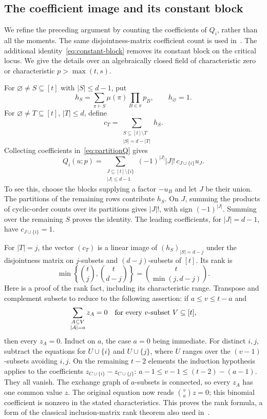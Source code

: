 \subsection{The coefficient image and its constant block}\label{app:compression}

We refine the preceding argument by counting the coefficients of
$Q_i$, rather than all the moments. The same disjointness-matrix
coefficient count is used in~\cite[Section 3]{Guo}. The additional
identity~\eqref{eq:constant-block} removes its constant block on
the critical locus. We give the details over an algebraically closed
field of characteristic zero or characteristic $p>\max(t,s)$.

For $\varnothing\ne S\subseteq[t]$ with $|S|\le d-1$, put
\[
 h_S=\sum_{\pi\vdash S}\mu(\pi)\prod_{B\in\pi}p_B,
 \qquad h_\varnothing=1.
\]
For $\varnothing\ne T\subseteq[t]$, $|T|\le d$, define
\[
 c_T=\sum_{\substack{S\subseteq[t]\setminus T\\|S|=d-|T|}}h_S.
\]
Collecting coefficients in~\eqref{eq:partitionQ} gives
\begin{equation}\label{eq:collected-Q}
 Q_i(u;p)=\sum_{\substack{J\subseteq[t]\setminus\{i\}\\|J|\le d-1}}
       (-1)^{|J|}|J|!\,c_{J\cup\{i\}}u_J.
\end{equation}
To see this, choose the blocks supplying a factor $-u_B$ and let
$J$ be their union. The partitions of the remaining rows contribute
$h_S$. On $J$, summing the products of cyclic-order counts over its
partitions gives $|J|!$, with sign $(-1)^{|J|}$. Summing over the
remaining $S$ proves the identity. The leading coefficients, for
$|J|=d-1$, have $c_{J\cup\{i\}}=1$.

For $|T|=j$, the vector $(c_T)$ is a linear image of $(h_S)_{|S|=d-j}$
under the disjointness matrix on $j$-subsets and $(d-j)$-subsets
of $[t]$. Its rank is
\[
 \min\left\{\binom tj,\binom t{d-j}\right\}
 =\binom t{\min(j,d-j)}.
\]
Here is a proof of the rank fact, including its characteristic range.
Transpose and complement subsets to reduce to the following assertion:
if $a\le v\le t-a$ and
\[
 \sum_{\substack{A\subseteq V\\|A|=a}}z_A=0
 \quad\hbox{for every $v$-subset $V\subseteq[t]$},
\]
then every $z_A=0$. Induct on $a$, the case $a=0$ being immediate.
For distinct $i,j$, subtract the equations for $U\cup\{i\}$ and
$U\cup\{j\}$, where $U$ ranges over the $(v-1)$-subsets avoiding
$i,j$. On the remaining $t-2$ elements the induction hypothesis
applies to the coefficients $z_{C\cup\{i\}}-z_{C\cup\{j\}}$:
$a-1\le v-1\le(t-2)-(a-1)$. They all vanish. The exchange graph
of $a$-subsets is connected, so every $z_A$ has one common value $z$.
The original equation now reads $\binom va z=0$; this binomial
coefficient is nonzero in the stated characteristics. This proves
the rank formula, a form of the classical inclusion-matrix rank
theorem also used in~\cite{Guo}.

